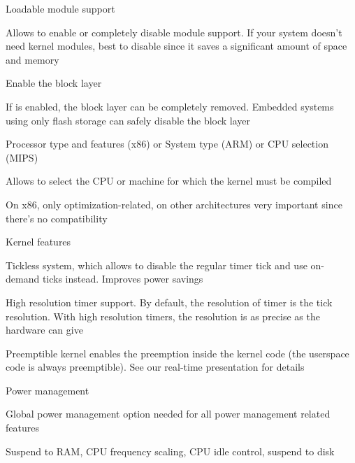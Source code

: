   \startitemize
  \item Loadable module support
    \startitemize
    \item Allows to enable or completely disable module support. If
      your system doesn't need kernel modules, best to disable since
      it saves a significant amount of space and memory
    \stopitemize
  \item Enable the block layer
    \startitemize
    \item If  is enabled, the block layer can be
      completely removed. Embedded systems using only flash storage
      can safely disable the block layer
    \stopitemize
  \item Processor type and features (x86) or System type (ARM) or CPU selection
    (MIPS)
    \startitemize
    \item Allows to select the CPU or machine for which the kernel
      must be compiled
    \item On x86, only optimization-related, on other architectures
      very important since there's no compatibility
    \stopitemize
  \stopitemize

  \startitemize
  \item Kernel features
    \startitemize
    \item Tickless system, which allows to disable the regular timer
      tick and use on-demand ticks instead. Improves power savings
    \item High resolution timer support. By default, the resolution of
      timer is the tick resolution. With high resolution timers, the
      resolution is as precise as the hardware can give
    \item Preemptible kernel enables the preemption inside the kernel
      code (the userspace code is always preemptible). See our
      real-time presentation for details
    \stopitemize
  \item Power management
    \startitemize
    \item Global power management option needed for all power
      management related features
    \item Suspend to RAM, CPU frequency scaling, CPU idle control,
      suspend to disk
    \stopitemize
  \stopitemize


